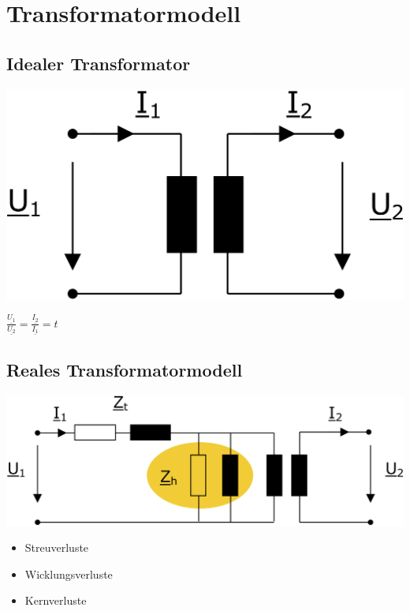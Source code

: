 \newpage
\section{Transformatormodell}


\subsection{Idealer Transformator}

\begin{minipage}[t]{0.4\columnwidth}
    \includegraphics[width=0.8\columnwidth, align=c]{images/Idealer_Transformator_1.png}
\end{minipage}
\hfill
\begin{minipage}[t]{0.58\columnwidth}
    $
        \boxed{\frac{\underline{U_1}}{\underline{U_2}} = \frac{\underline{I_2}}{\underline{I_1}} = t}
    $
\end{minipage}



\subsection{Reales Transformatormodell}

\includegraphics[width=0.98\columnwidth, align=c]{images/Reales_Transformatorbild_1.png}

\vspace{0.15cm}

\begin{itemize}
    \item Streuverluste
    \item Wicklungsverluste
    \item Kernverluste
\end{itemize}


